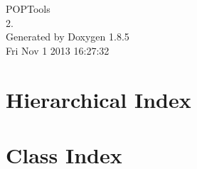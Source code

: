 \documentclass[twoside]{book}
\newcommand{\clearemptydoublepage}{%
  \newpage{\pagestyle{empty}\cleardoublepage}%
}
\begin{document}
\hypersetup{pageanchor=false}
\begin{titlepage}
\vspace*{7cm}
\begin{center}%
{\Large P\-O\-P\-Tools \\[1ex]\large 2. }\\
\vspace*{1cm}
{\large Generated by Doxygen 1.8.5}\\
\vspace*{0.5cm}
{\small Fri Nov 1 2013 16:27:32}\\
\end{center}
\end{titlepage}
\clearemptydoublepage
\tableofcontents
\clearemptydoublepage
{}
\hypersetup{pageanchor=true}

\chapter{Hierarchical Index}

\chapter{Class Index}

\end{document}
